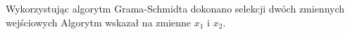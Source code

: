 Wykorzystując algorytm Grama-Schmidta dokonano selekcji dwóch zmiennych wejściowych Algorytm wskazał na zmienne $x_{1}$ i $x_{2}$.